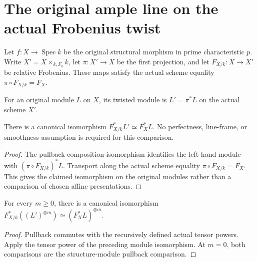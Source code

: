\section{The original ample line on the actual Frobenius twist}

Let $f:X\to\operatorname{Spec}k$ be the original structural morphism
in prime characteristic $p$.  Write $X'=X\times_{k,F_k}k$, let
$\pi:X'\to X$ be the first projection, and let
$F_{X/k}:X\to X'$ be relative Frobenius.  These maps satisfy the
actual scheme equality $\pi\circ F_{X/k}=F_X$.

\begin{definition}
\label{def:kn-frobenius-twisted-line}
\leanok
{}
For an original module $L$ on $X$, its twisted module is
$L'=\pi^*L$ on the actual scheme $X'$.
\end{definition}

\begin{lemma}
\label{lem:kn-relative-line-pullback}
\leanok
{}
There is a canonical isomorphism
$F_{X/k}^*L'\simeq F_X^*L$.  No perfectness, line-frame, or smoothness
assumption is required for this comparison.
\end{lemma}
\begin{proof}
The pullback-composition isomorphism identifies the left-hand module
with $(\pi\circ F_{X/k})^*L$.  Transport along the actual scheme equality
$\pi\circ F_{X/k}=F_X$.  This gives the claimed isomorphism on the original
modules rather than a comparison of chosen affine presentations.
\end{proof}

\begin{lemma}
\label{lem:kn-relative-line-power-pullback}
\leanok
{}
For every $m\geq0$, there is a canonical isomorphism
$F_{X/k}^*((L')^{\otimes m})\simeq(F_X^*L)^{\otimes m}$.
\end{lemma}
\begin{proof}
Pullback commutes with the recursively defined actual tensor powers.
Apply the tensor power of the preceding module isomorphism.  At
$m=0$, both comparisons are the structure-module pullback comparison.
\end{proof}

